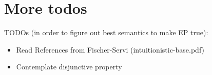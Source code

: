 \documentclass[12pt]{cmuthesis}
\theoremstyle{definition}
\theoremstyle{remark}
\begin{document}
\appendix

\section{More todos}
{\Huge TODOs} (in order to figure out best semantics to make EP true):
\begin{itemize}
\item Read References from Fischer-Servi (intuitionistic-base.pdf)
\item Contemplate disjunctive property
\end{itemize}

\backmatter


\end{document}

